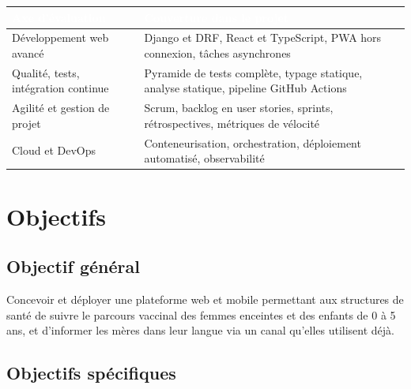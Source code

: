 \documentclass[11pt,a4paper]{article}
\newcommand{\hd}[1]{\textcolor{white}{\sffamily\bfseries\small #1}}
\newcommand{\rowhead}{\rowcolor{primary}}
\begin{document}
\vspace{2mm}
\noindent
\begin{tabularx}{\textwidth}{@{}R{4.6cm} L@{}}
\toprule
\rowhead \hd{Axe d'évaluation} & \hd{Couverture dans le projet} \\
\midrule
Développement web avancé & Django et DRF, React et TypeScript, PWA hors connexion, tâches asynchrones \\
Qualité, tests, intégration continue & Pyramide de tests complète, typage statique, analyse statique, pipeline GitHub Actions \\
Agilité et gestion de projet & Scrum, backlog en user stories, sprints, rétrospectives, métriques de vélocité \\
Cloud et DevOps & Conteneurisation, orchestration, déploiement automatisé, observabilité \\
\bottomrule
\end{tabularx}

\section{Objectifs}

\subsection{Objectif général}

\begin{synthese}
Concevoir et déployer une plateforme web et mobile permettant aux structures de santé
de suivre le parcours vaccinal des femmes enceintes et des enfants de 0 à 5 ans, et
d'informer les mères dans leur langue via un canal qu'elles utilisent déjà.
\end{synthese}

\subsection{Objectifs spécifiques}
\end{document}
